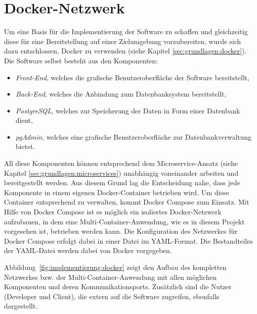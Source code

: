 \section{Docker-Netzwerk}

Um eine Basis für die Implementierung der Software zu schaffen und gleichzeitig diese für eine Bereitstellung auf einer Zielumgebung vorzubereiten, wurde sich dazu entschlossen, Docker zu verwenden (siehe Kapitel \ref{sec:grundlagen:docker}).
Die Software selbst besteht aus den Komponenten:
\begin{itemize}
	\item \emph{Front-End}, welches die grafische Benutzeroberfläche der Software bereitstellt,
	\item \emph{Back-End}, welches die Anbindung zum Datenbanksystem bereitstellt,
	\item \emph{PostgreSQL}, welches zur Speicherung der Daten in Form einer Datenbank dient,
	\item \emph{pgAdmin}, welches eine grafische Benutzeroberfläche zur Datenbankverwaltung bietet.
\end{itemize}

All diese Komponenten können entsprechend dem Microservice-Ansatz (siehe Kapitel \ref{sec:grundlagen:microservices}) unabhängig voneinander arbeiten und bereitgestellt werden.
Aus diesem Grund lag die Entscheidung nahe, dass jede Komponente in einem eigenen Docker-Container betrieben wird.
Um diese Container entsprechend zu verwalten, kommt Docker Compose zum Einsatz.
Mit Hilfe von Docker Compose ist es möglich ein isoliertes Docker-Netzwerk aufzubauen, in dem eine Multi-Container-Anwendung, wie es in diesem Projekt vorgesehen ist, betrieben werden kann.
Die Konfiguration des Netzwerkes für Docker Compose erfolgt dabei in einer Datei im \acs{YAML}-Format.
Die Bestandteiles der \acs{YAML}-Datei werden dabei von Docker vorgegeben.

Abbildung~\vref{fig:implementierung:docker} zeigt den Aufbau des kompletten Netzwerkes bzw. der Multi-Container-Anwendung mit allen möglichen Komponenten und deren Kommunikationsports.
Zusätzlich sind die Nutzer (Developer und Client), die extern auf die Software zugreifen, ebenfalls dargestellt.

